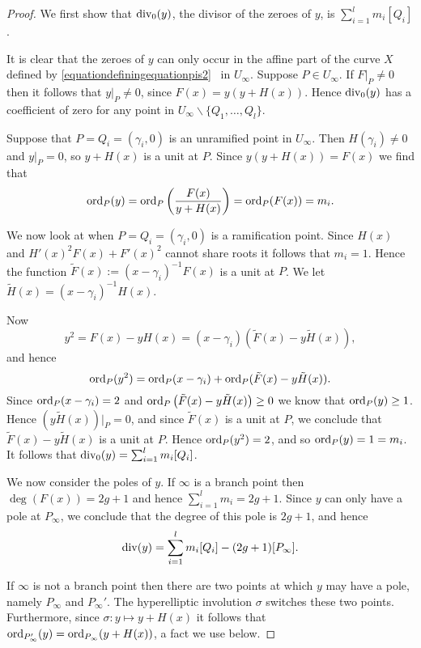     \begin{proof}
    We first show that $\operatorname{div}_0(y)$, the divisor of the zeroes of $y$, is $\sum_{i=1}^l m_i [Q_i]$.
    
    It is clear that the zeroes of $y$ can only occur in the affine part of the curve $X$ defined by \eqref{equationdefiningequationpis2} \ie~in $U_\infty$.
    Suppose $P\in U_\infty$.
    If $\left. F \right|_P \neq 0$ then it follows that $y|_P \neq 0$, since $F(x) = y (y + H(x))$.
    Hence $\operatorname{div}_0(y)$ has a coefficient  of zero for any point in $U_\infty\backslash \{Q_1, \ldots, Q_l \}$.
    
    Suppose that $P= Q_i = (\gamma_i, 0)$ is an unramified point in $U_\infty$.
    Then $H(\gamma_i) \neq 0$ and $\left. y \right|_P = 0$, so $y + H(x)$ is a unit at $P$.
    Since $y(y+H(x)) = F(x)$ we find that
        \begin{equation*}
        \operatorname{ord}_P(y) = \operatorname{ord}_P\left( \frac{F(x)}{y + H(x)} \right) = \operatorname{ord}_P(F(x)) = m_i.
        \end{equation*}
    
    We now look at when $P = Q_i = (\gamma_i, 0)$ is a ramification point.
    Since $H(x)$ and $H'(x)^2F(x) + F'(x)^2$ cannot share roots it follows that $m_i = 1$.
    Hence the function $\tilde F(x) := (x- \gamma_i)^{-1}F(x)$ is a unit at $P$.
    We let $\tilde H(x) = (x- \gamma_i)^{-1}H(x)$.
    
    
    Now 
        \[
        y^2 = F(x) - y H(x) = (x- \gamma_i) \left(\tilde F(x) - y \tilde H(x)\right),
        \]
    and hence
        \[
        \operatorname{ord}_P(y^2 ) = \operatorname{ord}_P(x-\gamma_i) + \operatorname{ord}_P(\tilde F(x) - y \tilde H(x)).
        \]
    Since $\operatorname{ord}_P(x-\gamma_i) = 2$ and $\operatorname{ord}_P\left(\tilde F(x) - y \tilde H(x)\right) \geq 0$ we know that $\operatorname{ord}_P(y) \geq 1$.
    Hence $(y \tilde H(x)) \big|_P = 0$, and since $\tilde F(x)$ is a unit at $P$, we conclude that $\tilde F(x) - y \tilde H(x)$ is a unit at $P$.
    Hence $\operatorname{ord}_P(y^2) = 2$, and so $\operatorname{ord}_P(y) = 1 = m_i$.
    It follows that $\operatorname{div}_0(y) =  \sum_{i=1}^l m_i [Q_i]$.
    
    We now consider the poles of $y$.
    If $\infty$ is a branch point then $\deg(F(x)) = 2g+1$ and hence $\sum_{i=1}^l m_i = 2g+1$.
    Since $y$ can only have a pole at $P_\infty$, we conclude that the degree of this pole is $2g+1$, and hence
        \[
        \operatorname{div}(y) = \sum_{i=1}^l m_i [Q_i] - (2g+1)[P_\infty].
        \]
    
    If $\infty$ is not a branch point then there are two points at which $y$ may have a pole, namely $P_\infty$ and $P_\infty'$.
    The hyperelliptic involution $\sigma$ switches these two points.
    Furthermore, since $\sigma \colon y \mapsto y+H(x)$ it follows that $\operatorname{ord}_{P_\infty'}(y) = \operatorname{ord}_{P_ \infty}(y+H(x))$, a fact we use below.
    

\end{proof}
